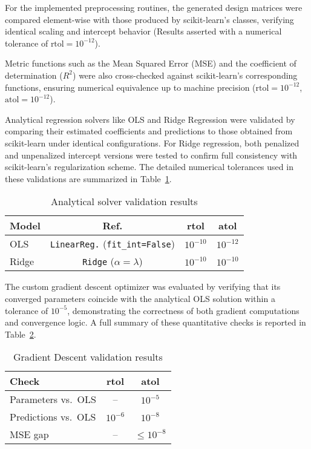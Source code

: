 \documentclass[
    article
 reprint,            %
 amsmath,amssymb,
 aps,
]{revtex4-2}
\begin{document}
For the implemented preprocessing routines, the generated design matrices were compared element-wise with those produced by scikit-learn's classes, verifying identical scaling and intercept behavior (Results asserted with a numerical tolerance of \(\text{rtol}=10^{-12}\)).

Metric functions such as the Mean Squared Error (MSE) and the coefficient of determination ($R^2$) were also cross-checked against scikit-learn's corresponding functions, ensuring numerical equivalence up to machine precision (\(\text{rtol}=10^{-12}\), \(\text{atol}=10^{-12}\)).

Analytical regression solvers like OLS and Ridge Regression were validated by comparing their estimated coefficients and predictions to those obtained from scikit-learn under identical configurations. 
For Ridge regression, both penalized and unpenalized intercept versions were tested to confirm full consistency with scikit-learn's regularization scheme. 
The detailed numerical tolerances used in these validations are summarized in Table~\ref{tab:analytical_solvers}.

\begin{table}[H]
\centering
\small
\setlength{\tabcolsep}{3pt}
\caption{Analytical solver validation results}
\label{tab:analytical_solvers}
\begin{tabular}{lccc}
\toprule
\textbf{Model} & \textbf{Ref.} & \textbf{rtol} & \textbf{atol} \\
\midrule
OLS & \texttt{LinearReg.} (\texttt{fit\_int=False}) & $10^{-10}$ & $10^{-12}$ \\
Ridge & \texttt{Ridge} ($\alpha=\lambda$) & $10^{-10}$ & $10^{-10}$ \\
\bottomrule
\end{tabular}
\end{table}

The custom gradient descent optimizer was evaluated by verifying that its converged parameters coincide with the analytical OLS solution within a tolerance of $10^{-5}$, demonstrating the correctness of both gradient computations and convergence logic. 
A full summary of these quantitative checks is reported in Table~\ref{tab:gd_validation}.

\begin{table}[H]
\centering
\small
\setlength{\tabcolsep}{3pt}
\caption{Gradient Descent validation results}
\label{tab:gd_validation}
\begin{tabular}{lcc}
\toprule
\textbf{Check} & \textbf{rtol} & \textbf{atol} \\
\midrule
Parameters vs.\ OLS & – & $10^{-5}$ \\
Predictions vs.\ OLS & $10^{-6}$ & $10^{-8}$ \\
MSE gap & – & $\le 10^{-8}$ \\
\bottomrule
\end{tabular}
\end{table}
\end{document}
